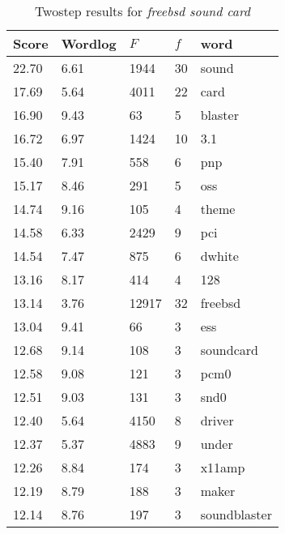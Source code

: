 \begin{table}[htbp]
  \begin{center}
    \begin{tabular}{|l|l|l|l|l|}
      \hline
      Score & Wordlog & $F$ & $f$ & word \\
      \hline
      \hline
22.70   &       6.61    &       1944    &       30      &       sound\\
17.69   &       5.64    &       4011    &       22      &       card\\
16.90   &       9.43    &       63      &       5       &       blaster\\
16.72   &       6.97    &       1424    &       10      &       3.1\\
15.40   &       7.91    &       558     &       6       &       pnp\\
15.17   &       8.46    &       291     &       5       &       oss\\
14.74   &       9.16    &       105     &       4       &       theme\\
14.58   &       6.33    &       2429    &       9       &       pci\\
14.54   &       7.47    &       875     &       6       &       dwhite\\
13.16   &       8.17    &       414     &       4       &       128\\
13.14   &       3.76    &       12917   &       32      &       freebsd\\
13.04   &       9.41    &       66      &       3       &       ess\\
12.68   &       9.14    &       108     &       3       &       soundcard\\
12.58   &       9.08    &       121     &       3       &       pcm0\\
12.51   &       9.03    &       131     &       3       &       snd0\\
12.40   &       5.64    &       4150    &       8       &       driver\\
12.37   &       5.37    &       4883    &       9       &       under\\
12.26   &       8.84    &       174     &       3       &       x11amp\\
12.19   &       8.79    &       188     &       3       &       maker\\
12.14   &       8.76    &       197     &       3       &       soundblaster\\
\hline
    \end{tabular}
    \caption{Twostep results for \emph{freebsd sound card}}
    \label{tab:twostep}
  \end{center}
\end{table}

